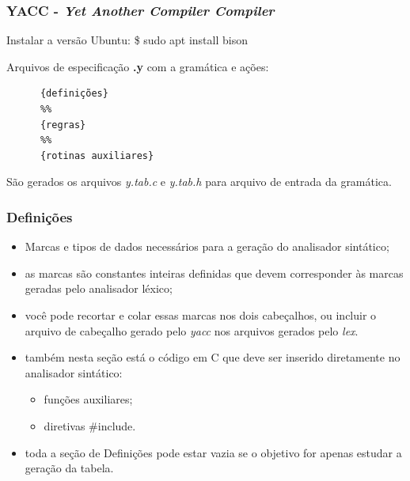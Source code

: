 \documentclass[table]{beamer}
\begin{document}
\begin{frame}[fragile]
   \frametitle{YACC - \textit{Yet Another Compiler Compiler}}
   \begin{block}{Instalar a versão Ubuntu:}
      \$ sudo apt install bison
   \end{block}
   \begin{block}{Arquivos de especificação \textbf{.y} com a gramática e ações:}
      \begin{verbatim}
      {definições}
      %%
      {regras}
      %%
      {rotinas auxiliares}
      \end{verbatim}
   \end{block}
   São gerados os arquivos \textit{y.tab.c} e \textit{y.tab.h} para arquivo de entrada da gramática.
\end{frame}

   \begin{frame}
   \frametitle{Definições}
   \begin{itemize}
      \item Marcas e tipos de dados necessários para a geração do analisador sintático;
      \item as marcas são constantes inteiras definidas que devem corresponder às marcas geradas pelo analisador léxico;
      \item você pode recortar e colar essas marcas nos dois cabeçalhos, ou incluir o arquivo de cabeçalho gerado pelo \textit{yacc} nos arquivos gerados pelo \textit{lex}.
      \item também nesta seção está o código em C que deve ser inserido diretamente no analisador sintático:
      \begin{itemize}
         \item funções auxiliares;
         \item diretivas \#include.
      \end{itemize}
      \item toda a seção de Definições pode estar vazia se o objetivo for apenas estudar a geração da tabela.
   \end{itemize}
\end{frame}
\end{document}
